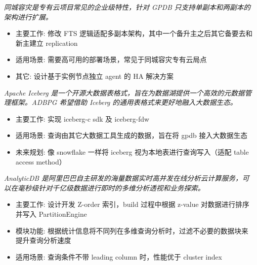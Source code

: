 \documentclass{resume}
\begin{document}
\textit{同城容灾是专有云项目常见的企业级特性，针对 GPDB 只支持单副本和两副本的架构进行扩展。}
\begin{onehalfspacing}
\begin{itemize}
  \item 主要工作: 修改 FTS 逻辑适配多副本架构，其中一个备升主之后其它备要去和新主建立 replication
  \item 适用场景: 需要高可用的部署场景，常见于同城容灾专有云局点
  \item 其它: 设计基于实例节点独立 agent 的 HA 解决方案
\end{itemize}
\end{onehalfspacing}

\textit{Apache Iceberg 是一个开源大数据表格式，旨在为数据湖提供一个高效的元数据管理框架。ADBPG 希望借助 Iceberg 的通用表格式来更好地融入大数据生态。}
\begin{onehalfspacing}
\begin{itemize}
  \item 主要工作: 实现 iceberg-c sdk 及 iceberg-fdw
  \item 适用场景: 查询由其它大数据工具生成的数据，旨在将 gpdb 接入大数据生态
  \item 未来规划: 像 snowflake 一样将 iceberg 视为本地表进行查询写入（适配 table access method）
\end{itemize}
\end{onehalfspacing}

\textit{AnalyticDB 是阿里巴巴自主研发的海量数据实时高并发在线分析云计算服务，可以在毫秒级针对千亿级数据进行即时的多维分析透视和业务探索。}
\begin{onehalfspacing}
\begin{itemize}
  \item 主要工作: 设计开发 Z-order 索引，build 过程中根据 z-value 对数据进行排序并写入 PartitionEngine
  \item 模块功能: 根据统计信息将不同列在多维查询分析时，过滤不必要的数据块来提升查询分析速度
  \item 适用场景: 查询条件不带 leading column 时，性能优于 cluster index
\end{itemize}
\end{onehalfspacing}
\end{document}
